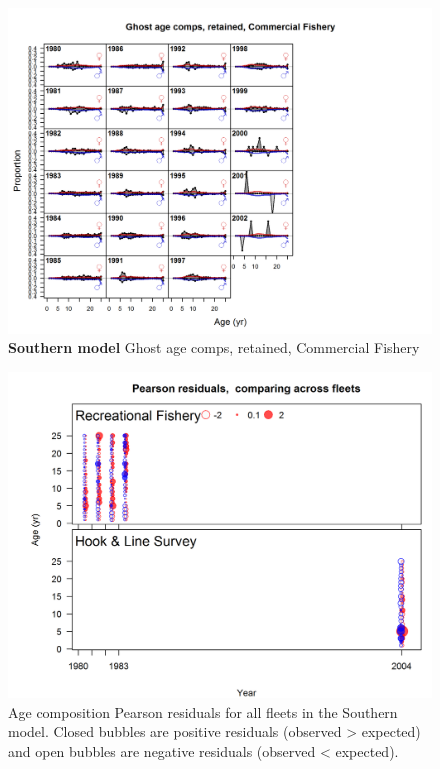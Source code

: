 \documentclass[12pt,]{article}
\begin{document}
\begin{figure}[htbp]
\centering
\includegraphics{./r4ss/plots_mod2/comp_gstagefit_flt2mkt2.png}
\caption{\textbf{Southern model} Ghost age comps, retained, Commercial
Fishery \label{fig:mod2_11_comp_gstagefit_flt2mkt2}}
\end{figure}

\begin{figure}[htbp]
\centering
\includegraphics{r4ss/plots_mod2/comp_agefit__multi-fleet_comparison.png}
\caption{Age composition Pearson residuals for all fleets in the
Southern model. Closed bubbles are positive residuals (observed
\textgreater{} expected) and open bubbles are negative residuals
(observed \textless{} expected). \label{fig:comp_Pearson_age_mod2}}
\end{figure}
\end{document}
